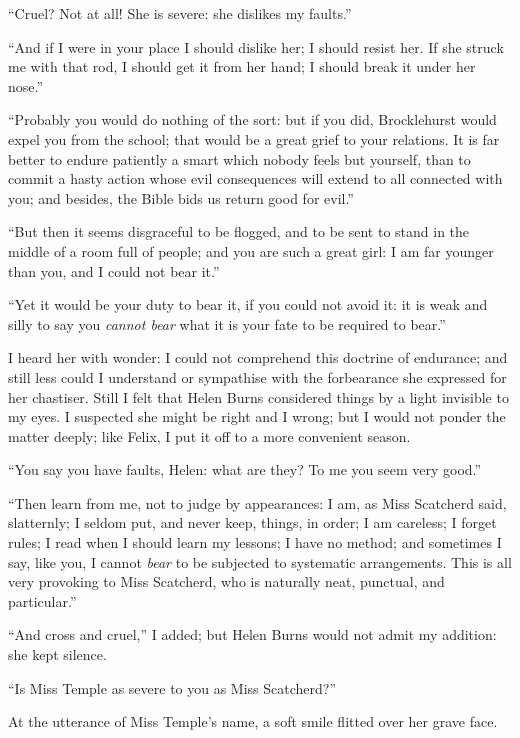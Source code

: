 \enquote{Cruel?  Not at all!  She is severe: she dislikes my faults.}

\enquote{And if I were in your place I should dislike her; I should
resist her.  If she struck me with that rod, I should get it from her
hand; I should break it under her nose.}

\enquote{Probably you would do nothing of the sort: but if you did, \Mr{}
Brocklehurst would expel you from the school; that would be a great
grief to your relations.  It is far better to endure patiently a smart
which nobody feels but yourself, than to commit a hasty action whose
evil consequences will extend to all connected with you; and besides,
the Bible bids us return good for evil.}

\enquote{But then it seems disgraceful to be flogged, and to be sent to
stand in the middle of a room full of people; and you are such a great
girl: I am far younger than you, and I could not bear it.}

\enquote{Yet it would be your duty to bear it, if you could not avoid it: it is
weak and silly to say you \emph{cannot bear} what it is your fate to be
required to bear.}

I heard her with wonder: I could not comprehend this doctrine of
endurance; and still less could I understand or sympathise with the
forbearance she expressed for her chastiser.  Still I felt that Helen
Burns considered things by a light invisible to my eyes.  I suspected
she might be right and I wrong; but I would not ponder the matter
deeply; like Felix, I put it off to a more convenient season.

\enquote{You say you have faults, Helen: what are they?  To me you seem
very good.}

\enquote{Then learn from me, not to judge by appearances: I am, as Miss
Scatcherd said, slatternly; I seldom put, and never keep, things, in
order; I am careless; I forget rules; I read when I should learn my
lessons; I have no method; and sometimes I say, like you, I cannot
\emph{bear} to be subjected to systematic arrangements.  This is all
very provoking to Miss Scatcherd, who is naturally neat, punctual, and
particular.}

\enquote{And cross and cruel,} I added; but Helen Burns would not admit
my addition: she kept silence.

\enquote{Is Miss Temple as severe to you as Miss Scatcherd?}

At the utterance of Miss Temple's name, a soft smile flitted over her
grave face.

